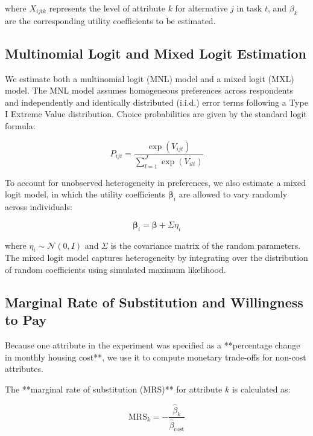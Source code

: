 \documentclass[3p,11pt ]{elsarticle}
\begin{document}
\noindent where \( X_{ijtk} \) represents the level of attribute \( k \) for alternative \( j \) in task \( t \), and \( \beta_k \) are the corresponding utility coefficients to be estimated.

\subsection{Multinomial Logit and Mixed Logit Estimation}

We estimate both a multinomial logit (MNL) model and a mixed logit (MXL) model. The MNL model assumes homogeneous preferences across respondents and independently and identically distributed (i.i.d.) error terms following a Type I Extreme Value distribution. Choice probabilities are given by the standard logit formula:

\begin{equation}
P_{ijt} = \frac{\exp(V_{ijt})}{\sum_{l=1}^{J} \exp(V_{ilt})}
\end{equation}

To account for unobserved heterogeneity in preferences, we also estimate a mixed logit model, in which the utility coefficients \( \boldsymbol{\beta}_i \) are allowed to vary randomly across individuals:

\begin{equation}
\boldsymbol{\beta}_i = \boldsymbol{\beta} + \Sigma \eta_i
\end{equation}

\noindent where \( \eta_i \sim \mathcal{N}(0, I) \) and \( \Sigma \) is the covariance matrix of the random parameters. The mixed logit model captures heterogeneity by integrating over the distribution of random coefficients using simulated maximum likelihood.

\subsection{Marginal Rate of Substitution and Willingness to Pay}

Because one attribute in the experiment was specified as a **percentage change in monthly housing cost**, we use it to compute monetary trade-offs for non-cost attributes. 

The **marginal rate of substitution (MRS)** for attribute \( k \) is calculated as:

\begin{equation}
\text{MRS}_k = -\frac{\hat{\beta}_k}{\hat{\beta}_{\text{cost}}}
\end{equation}
\end{document}
